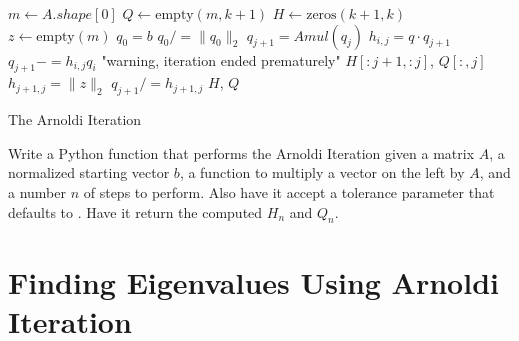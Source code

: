 \begin{algorithm}
\begin{algorithmic}[1]
	\State $m \gets A.shape[0]$					
	\State $Q \gets \text{empty}\left(m, k+1\right)$
	\State $H \gets \text{zeros}\left( k+1, k\right)$
	\State $z \gets \text{empty}\left(m\right)$
	\State $q_0 = b$							
	\State $q_0 /= \|q_0\|_2$						
								
		\State $q_{j+1} = Amul \left(q_j\right)$		
							
			\State $h_{i,j} = q \cdot q_{j+1}$		
			\State $q_{j+1} -= h_{i,j} q_i$
		\EndFor
							
			\State {} "warning, iteration ended prematurely"
			\State {} $H[:j+1,:j]$, $Q[:,j]$
		\EndIf
		\State $h_{j+1,j} = \|z\|_2$				
		\State $q_{j+1} /= h_{j+1,j}$				
	\EndFor
	\State {} $H$, $Q$
\EndProcedure
\end{algorithmic}
\caption{The Arnoldi Iteration}
\label{alg:arnoldi_iteration}
\end{algorithm}

\begin{problem}
Write a Python function that performs the Arnoldi Iteration given a matrix $A$, a normalized starting vector $b$, a function to multiply a vector on the left by $A$, and a number $n$ of steps to perform.
Also have it accept a tolerance parameter that defaults to .
Have it return the computed $H_n$ and $Q_n$.
\end{problem}




\section*{Finding Eigenvalues Using Arnoldi Iteration}



